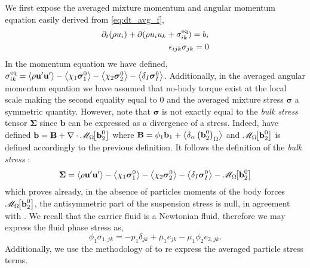 We first expose the averaged mixture momentum and angular momentum equation easily derived from \ref{eq:dt_avg_f}, 
\begin{align}
    \partial_t (\rho u_i)
    + \partial (\rho u_iu_k
    + \sigma_{ik}^\text{eq})
    = b_i\\
    \epsilon_{ijk} \sigma_{jk}
    = 0 
    \label{eq:momentum_bulk}
\end{align}
In the momentum equation we have defined, $\sigma_{ik}^\text{eq} = \left<\rho\textbf{u}'\textbf{u}'\right>
- \left<\chi_1\bm{\sigma}_1^0\right>-\left<\chi_2\bm{\sigma}_2^0\right> - \left<\delta_I \bm{\sigma}_I^0\right>$. 
Additionally, in the averaged angular momentum equation we have assumed that no-body torque exist at the local scale making the second equality equal to $0$ \citet{leal2007advanced} and the averaged mixture stress $\bm{\sigma}$ a symmetric quantity. 
However, note that $\bm{\sigma}$ is not exactly equal to the \textit{bulk stress} tensor $\bm{\Sigma}$ since $\textbf{b}$ can be expressed as a divergence of a stress.
Indeed, have defined $\textbf{b} = \textbf{B} + \mathbf{\nabla}\cdot  \mathscr{M}_\Omega\!\!\left[\textbf{b}_2^0\right]$ where $\textbf{B} = \phi_1 \textbf{b}_1 +  \left<\delta_\alpha \left( \textbf{b}_2^0  \right)_\Omega\right>$ and  $\mathscr{M}_\Omega\!\!\left[\textbf{b}_2^0\right]$ is defined accordingly to the previous definition. 
It follows the definition of the \textit{bulk stress} : 
\begin{equation}
    \bm{\Sigma}
    = 
    \left<\rho\textbf{u}'\textbf{u}'\right>
    - \left<\chi_1\bm{\sigma}_1^0\right>
    - \left<\chi_2\bm{\sigma}_2^0\right> 
    - \left<\delta_I \bm{\sigma}_I^0\right>
    - \mathscr{M}_\Omega\!\!\left[\textbf{b}_2^0\right]
\end{equation}
which proves already, in the absence of particles moments of the body forces $\mathscr{M}_\Omega\!\!\left[\textbf{b}_2^0\right]$, the antisymmetric part of the suspension stress is null, in agreement with \citet{dolata2020heterogeneous}.
We recall that the carrier fluid is a Newtonian fluid, therefore we may express the fluid phase stress as, 
\begin{equation}
    \phi_1 \sigma_{1,jk}
    = -p_1 \delta_{jk}
    + \mu_1 e_{jk}
    - \mu_1 \phi_2 e_{2,jk}. 
\end{equation} 
Additionally, we use the methodology of \citep{lhuillier1992volume,lhuillier1996contribution} to re express the averaged particle stress terms. 
